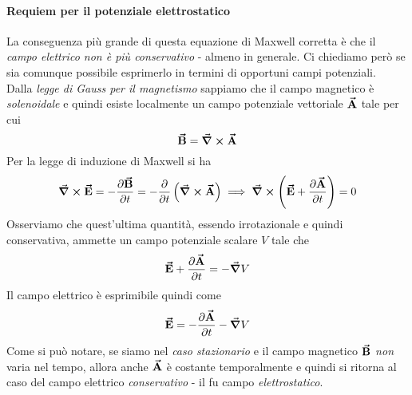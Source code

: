 \paragraph{Requiem per il potenziale elettrostatico}
La conseguenza più grande di questa equazione di Maxwell corretta è che il \textit{campo elettrico non è più conservativo} - almeno in generale. Ci chiediamo però se sia comunque possibile esprimerlo in termini di opportuni campi potenziali.\\
Dalla \textit{legge di Gauss per il magnetismo} sappiamo che il campo magnetico è \textit{solenoidale} e quindi esiste localmente un campo potenziale vettoriale $\vb*{\va{A}}$ tale per cui
\begin{equation*}
	\vb*{\va{B}}=\curl{\vb*{\va{A}}}
\end{equation*}
Per la legge di induzione di Maxwell si ha
\begin{equation*}
	\curl{\vb*{\va{E}}}=-\pdv{\vb*{\va{B}}}{t}=-\pdv{t}\left(\curl{\vb*{\va{A}}}\right)\implies \curl\left(\vb*{\va{E}}+\pdv{\vb*{\va{A}}}{t}\right)=0
\end{equation*}
Osserviamo che quest'ultima quantità, essendo irrotazionale e quindi conservativa, ammette un campo potenziale scalare $V$ tale che 
\begin{equation*}
	\vb*{\va{E}}+\pdv{\vb*{\va{A}}}{t}=-\grad{V}
\end{equation*}
Il campo elettrico è esprimibile quindi come
\begin{equation}
	\vb*{\va{E}}=-\pdv{\vb*{\va{A}}}{t}-\grad{V}
\end{equation}
Come si può notare, se siamo nel \textit{caso stazionario} e il campo magnetico $\vb*{\va{B}}$ \textit{non} varia nel tempo, allora anche $\vb*{\va{A}}$ è costante temporalmente e quindi si ritorna al caso del campo elettrico \textit{conservativo} - il fu campo \textit{elettrostatico}.

